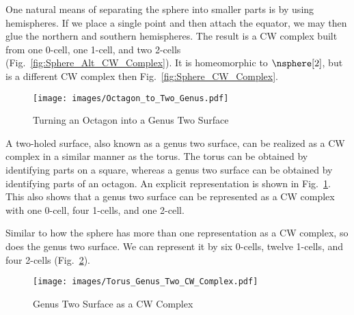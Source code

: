 \documentclass{book}                                                           %
\begin{document}
            \hfill
            \begin{minipage}[t]{0.54\textwidth}
                \begin{example}
                    One natural means of separating the sphere into smaller
                    parts is by using hemispheres. If we place a single point
                    and then attach the equator, we may then glue the northern
                    and southern hemispheres. The result is a CW complex built
                    from one 0-cell, one 1-cell, and two 2-cells
                    (Fig.~\ref{fig:Sphere_Alt_CW_Complex}). It is homeomorphic
                    to $\nsphere[2]$, but is a different CW complex then
                    Fig.~\ref{fig:Sphere_CW_Complex}.
                \end{example}
            \end{minipage}
            \newpage
            \begin{figure}
                \centering
                \captionsetup{type=figure}
                \texttt{[image: images/Octagon\_to\_Two\_Genus.pdf]}
                \caption{Turning an Octagon into a Genus Two Surface}
                \label{fig:Octagon_to_Genus_Two}
            \end{figure}
            \begin{example}
                A two-holed surface, also known as a genus two surface, can be
                realized as a CW complex in a similar manner as the torus. The
                torus can be obtained by identifying parts on a square, whereas
                a genus two surface can be obtained by identifying parts of an
                octagon. An explicit representation is shown in
                Fig.~\ref{fig:Octagon_to_Genus_Two}. This also shows that a
                genus two surface can be represented as a CW complex with one
                0-cell, four 1-cells, and one 2-cell.
            \end{example}
            \begin{example}
                Similar to how the sphere has more than one representation as a
                CW complex, so does the genus two surface. We can represent it
                by six 0-cells, twelve 1-cells, and four 2-cells
                (Fig.~\ref{fig:Genus_Two_CW_Complex}).
            \end{example}
            \begin{figure}[H]
                \centering
                \captionsetup{type=figure}
                \texttt{[image: images/Torus\_Genus\_Two\_CW\_Complex.pdf]}
                \caption{Genus Two Surface as a CW Complex}
                \label{fig:Genus_Two_CW_Complex}
            \end{figure}
\end{document}
